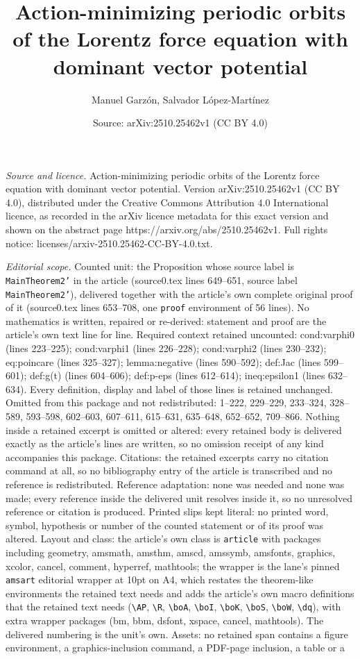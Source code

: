 \documentclass[10pt,a4paper]{amsart}
\title[Action-minimizing periodic orbits of the Lorentz force equat]{Action-minimizing periodic orbits of the Lorentz force equation with dominant vector potential}
\author{Manuel Garz\'on, Salvador L\'opez-Mart\'inez}
\date{Source: arXiv:2510.25462v1 (CC BY 4.0)}
\begin{document}
\maketitle

\noindent\emph{Source and licence.} Action-minimizing periodic orbits of the Lorentz force equation with dominant vector potential. Version arXiv:2510.25462v1 (CC BY 4.0), distributed under the Creative Commons Attribution 4.0 International licence, as recorded in the arXiv licence metadata for this exact version and shown on the abstract page https://arxiv.org/abs/2510.25462v1. Full rights notice: licenses/arxiv-2510.25462-CC-BY-4.0.txt.\par\smallskip

\noindent\textit{Editorial scope.} Counted unit: the Proposition whose source label is \texttt{MainTheorem2'} in the article (source0.tex lines 649--651, source label \texttt{MainTheorem2'}), delivered together with the article's own complete original proof of it (source0.tex lines 653--708, one \texttt{proof} environment of 56 lines). No mathematics is written, repaired or re-derived: statement and proof are the article's own text line for line. Required context retained uncounted: cond:varphi0 (lines 223--225); cond:varphi1 (lines 226--228); cond:varphi2 (lines 230--232); eq:poincare (lines 325--327); lemma:negative (lines 590--592); def:Jac (lines 599--601); def:g(t) (lines 604--606); def:p-eps (lines 612--614); ineq:epsilon1 (lines 632--634). Every definition, display and label of those lines is retained unchanged. Omitted from this package and not redistributed: 1--222, 229--229, 233--324, 328--589, 593--598, 602--603, 607--611, 615--631, 635--648, 652--652, 709--866. Nothing inside a retained excerpt is omitted or altered: every retained body is delivered exactly as the article's lines are written, so no omission receipt of any kind accompanies this package. Citations: the retained excerpts carry no citation command at all, so no bibliography entry of the article is transcribed and no reference is redistributed. Reference adaptation: none was needed and none was made; every reference inside the delivered unit resolves inside it, so no unresolved reference or citation is produced. Printed slips kept literal: no printed word, symbol, hypothesis or number of the counted statement or of its proof was altered. Layout and class: the article's own class is \texttt{article} with packages including geometry, amsmath, amsthm, amscd, amssymb, amsfonts, graphics, xcolor, cancel, comment, hyperref, mathtools; the wrapper is the lane's pinned \texttt{amsart} editorial wrapper at 10pt on A4, which restates the theorem-like environments the retained text needs and adds the article's own macro definitions that the retained text needs (\texttt{\textbackslash AP}, \texttt{\textbackslash R}, \texttt{\textbackslash boA}, \texttt{\textbackslash boI}, \texttt{\textbackslash boK}, \texttt{\textbackslash boS}, \texttt{\textbackslash boW}, \texttt{\textbackslash dq}), with extra wrapper packages (bm, bbm, dsfont, xspace, cancel, mathtools). The delivered numbering is the unit's own. Assets: no retained span contains a figure environment, a graphics-inclusion command, a PDF-page inclusion, a table or a 
\end{document}
